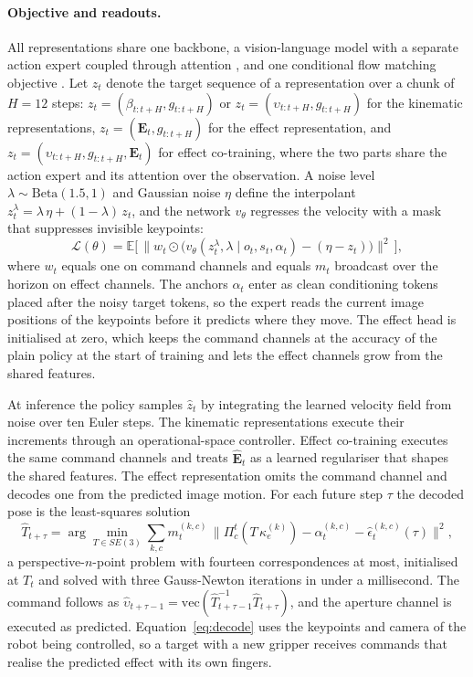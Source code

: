 \paragraph{Objective and readouts.}
All representations share one backbone, a vision-language model with a separate action expert coupled through attention \citep{pi2025pi05, black2024pi0}, and one conditional flow matching objective \citep{lipman2023flow}. Let $z_t$ denote the target sequence of a representation over a chunk of $H = 12$ steps: $z_t = (\beta_{t:t+H}, g_{t:t+H})$ or $z_t = (\upsilon_{t:t+H}, g_{t:t+H})$ for the kinematic representations, $z_t = (\mathbf{E}_t, g_{t:t+H})$ for the effect representation, and $z_t = (\upsilon_{t:t+H}, g_{t:t+H}, \mathbf{E}_t)$ for effect co-training, where the two parts share the action expert and its attention over the observation. A noise level $\lambda \sim \mathrm{Beta}(1.5, 1)$ and Gaussian noise $\eta$ define the interpolant $z_t^{\lambda} = \lambda\,\eta + (1-\lambda)\,z_t$, and the network $v_\theta$ regresses the velocity with a mask that suppresses invisible keypoints:
\begin{equation}
\mathcal{L}(\theta) = \mathbb{E}\Big[\, \big\| w_t \odot \big(v_\theta(z_t^{\lambda}, \lambda \mid o_t, s_t, \alpha_t) - (\eta - z_t)\big) \big\|^2 \,\Big],
\label{eq:loss}
\end{equation}
where $w_t$ equals one on command channels and equals $m_t$ broadcast over the horizon on effect channels. The anchors $\alpha_t$ enter as clean conditioning tokens placed after the noisy target tokens, so the expert reads the current image positions of the keypoints before it predicts where they move. The effect head is initialised at zero, which keeps the command channels at the accuracy of the plain policy at the start of training and lets the effect channels grow from the shared features.

At inference the policy samples $\hat z_t$ by integrating the learned velocity field from noise over ten Euler steps. The kinematic representations execute their increments through an operational-space controller. Effect co-training executes the same command channels and treats $\hat{\mathbf{E}}_t$ as a learned regulariser that shapes the shared features. The effect representation omits the command channel and decodes one from the predicted image motion. For each future step $\tau$ the decoded pose is the least-squares solution
\begin{equation}
\hat T_{t+\tau} = \arg\min_{T \in SE(3)} \sum_{k,c} m_t^{(k,c)} \,\Big\| \Pi_c^{t}\!\left(T\,\kappa_{e}^{(k)}\right) - \alpha_t^{(k,c)} - \hat\epsilon_t^{(k,c)}(\tau) \Big\|^2 ,
\label{eq:decode}
\end{equation}
a perspective-$n$-point problem with fourteen correspondences at most, initialised at $T_t$ and solved with three Gauss-Newton iterations in under a millisecond. The command follows as $\hat\upsilon_{t+\tau-1} = \mathrm{vec}(\hat T_{t+\tau-1}^{-1}\hat T_{t+\tau})$, and the aperture channel is executed as predicted. Equation~\eqref{eq:decode} uses the keypoints and camera of the robot being controlled, so a target with a new gripper receives commands that realise the predicted effect with its own fingers.

